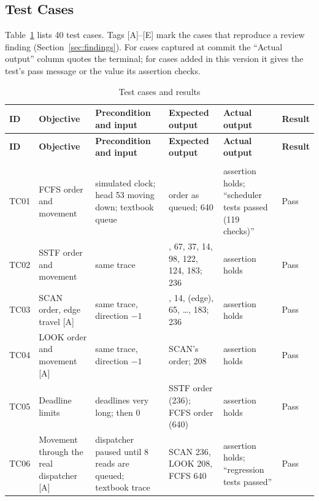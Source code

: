 \documentclass[12pt,a4paper]{article}
\DeclareRobustCommand{\code}[1]{\texttt{\detokenize{#1}}}
\newcommand{\tabref}[1]{Table~\ref{#1}}
\begin{document}
\subsection{Test Cases}
\label{sec:testcases}
\tabref{tab:tests} lists 40 test cases. Tags [A]--[E] mark the cases that reproduce a review finding (Section~\ref{sec:findings}). For cases captured at commit \code{a7e489c} the ``Actual output'' column quotes the terminal; for cases added in this version it gives the test's pass message or the value its assertion checks.

{\footnotesize
\setlength{\tabcolsep}{3.5pt}
\begin{longtable}{@{}>{\raggedright\arraybackslash}p{0.8cm}>{\raggedright\arraybackslash}p{2.9cm}>{\raggedright\arraybackslash}p{3.5cm}>{\raggedright\arraybackslash}p{3.1cm}>{\raggedright\arraybackslash}p{3.2cm}>{\raggedright\arraybackslash}p{1.05cm}@{}}
\caption{Test cases and results}\label{tab:tests}\\
\toprule
\textbf{ID} & \textbf{Objective} & \textbf{Precondition and input} & \textbf{Expected output} & \textbf{Actual output} & \textbf{Result} \\
\midrule
\endfirsthead
\toprule
\textbf{ID} & \textbf{Objective} & \textbf{Precondition and input} & \textbf{Expected output} & \textbf{Actual output} & \textbf{Result} \\
\midrule
\endhead
\midrule \multicolumn{6}{r}{\emph{continued on next page}} \\
\endfoot
\bottomrule
\endlastfoot
TC01 & FCFS order and movement & simulated clock; head 53 moving down; textbook queue & order as queued; 640 & assertion holds; ``scheduler tests passed (119 checks)'' & Pass \\
TC02 & SSTF order and movement & same trace & 65, 67, 37, 14, 98, 122, 124, 183; 236 & assertion holds & Pass \\
TC03 & SCAN order, edge travel [A] & same trace, direction $-1$ & 37, 14, (edge), 65, \ldots, 183; 236 & assertion holds & Pass \\
TC04 & LOOK order and movement [A] & same trace, direction $-1$ & SCAN's order; 208 & assertion holds & Pass \\
TC05 & Deadline limits & deadlines very long; then 0 & SSTF order (236); FCFS order (640) & assertion holds & Pass \\
TC06 & Movement through the real dispatcher [A] & dispatcher paused until 8 reads are queued; textbook trace & SCAN 236, LOOK 208, FCFS 640 & assertion holds; ``regression tests passed'' & Pass \\

\end{longtable}}
\end{document}
